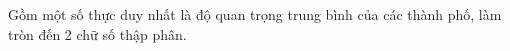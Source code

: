 Gồm một số thực duy nhất là độ quan trọng trung bình của các thành phố, làm tròn đến 2 chữ số thập phân.